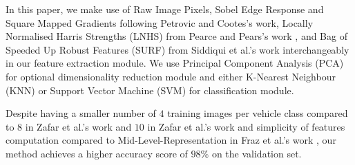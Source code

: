 In this paper, we make use of 
Raw Image Pixels, Sobel Edge Response and Square Mapped Gradients following Petrovic and Cootes's \citep{petrovic2004analysis} work, 
Locally Normalised Harris Strengths (LNHS) from Pearce and Pears's work \citep{pearce2011automatic}, and 
Bag of Speeded Up Robust Features (SURF) from Siddiqui et al.'s work \citep{siddiqui2016real} 
interchangeably in our feature extraction module.
We use Principal Component Analysis (PCA) for optional dimensionality reduction module and either 
K-Nearest Neighbour (KNN) or
Support Vector Machine (SVM) for classification module.

Despite having a smaller number of $4$ training images per vehicle class compared to $8$ in Zafar et al.'s work \citep{zafar2007two} and $10$ in Zafar et al.'s work \citep{zafar2009localized} and simplicity of features computation compared to Mid-Level-Representation in Fraz et al.'s work \citep{fraz2014mid}, our method achieves a higher accuracy score of $98\%$ on the validation set.






